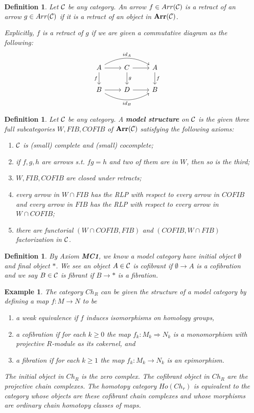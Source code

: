 \documentclass[11pt]{article}
\newtheorem{dfn}[thm]{Definition}
\newtheorem{ex}[thm]{Example}
\newcommand{\calc}{{\cal C}}
\newcommand{\Lrta}{\Longrightarrow}
\newcommand{\lrta}{\longrightarrow}
\begin{document}
\begin{dfn}
Let $\calc$ be any category. An arrow $f\in Arr(\calc)$ is a retract of an arrow $g\in Arr(\calc)$ if it is a retract of an object in $\mathbf{Arr}(\calc)$.

Explicitly, $f$ is a retract of $g$ if we are given a commutative diagram as the following:
$$
\begin{tikzcd}
A \arrow[r] \arrow[rr, "id_A", bend left] \arrow[d, "f"'] & C \arrow[r] \arrow[d, "g"] & A \arrow[d, "f"] \\
B \arrow[r] \arrow[rr, "id_B"', bend right] & D \arrow[r] & B
\end{tikzcd}
$$
\end{dfn}

\begin{dfn}
Let $\calc$ be any category. A \textbf{model structure} on $\calc$ is  the given three full subcategories $W, FIB, COFIB$ of $\mathbf{Arr}(\calc)$ satisfying the following axioms:
\begin{enumerate}[label=\textbf{MC\arabic*}]
\item $\calc$ is (small) complete and (small) cocomplete;
\item if $f,g,h$ are arrows s.t. $fg=h$ and two of them are in $W$, then so is the third;
\item $W,FIB,COFIB$ are closed under retracts;
\item every arrow in $W\cap FIB$ has the RLP with respect to every arrow in $COFIB$ and every arrow in $FIB$ has the RLP with respect to every arrow in $W\cap COFIB$;
\item there are functorial $(W\cap COFIB, FIB)$ and $(COFIB,W\cap FIB)$ factorization in $\calc$.
\end{enumerate}
\end{dfn}

\begin{dfn}
By Axiom \textbf{MC1}, we know a model category have initial object $\emptyset$ and final object $*$. We see an object $A\in \calc$ is cofibrant if $\emptyset\lrta A$ is a cofibration and we say $B\in\calc$ is fibrant if $B\lrta *$ is a fibration.
\end{dfn}

\begin{ex}
The category $Ch_R$ can be given the structure of a model category by defining a map $f: M\lrta N$ to be 
\begin{enumerate}[label=(\roman*)]
\item a weak equivalence if $f$ induces isomorphisms on homology groups,
\item a cofibration if for each $k\geq 0$ the map $f_k:M_k\Lrta N_k$ is a monomorphism with projective $R$-module as its cokernel, and
\item a fibration if for each $k\geq 1$ the map $f_k: M_k\lrta N_k$ is an epimorphism.
\end{enumerate} The initial object in $Ch_R$ is the zero complex. 
The cofibrant object in $Ch_R$ are the projective chain complexes. The homotopy category $Ho(Ch_r)$ is equivalent to the category whose objects are these cofibrant chain complexes and whose morphisms are ordinary chain homotopy classes of maps.
\end{ex}
\end{document}
